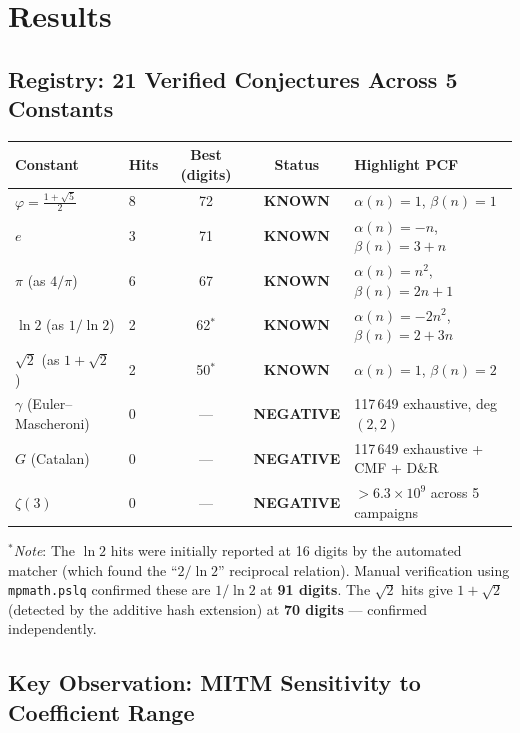 \documentclass[11pt,a4paper]{article}
\newcommand{\KNOWN}{\textcolor{known}{\textbf{KNOWN}}}
\newcommand{\NEG}{\textcolor{negative}{\textbf{NEGATIVE}}}
\begin{document}
\section{Results}

\subsection{Registry: 21 Verified Conjectures Across 5 Constants}

\begin{center}
\renewcommand{\arraystretch}{1.2}
\begin{tabular}{@{}llccl@{}}
\toprule
\textbf{Constant} & \textbf{Hits} & \textbf{Best (digits)} & \textbf{Status} & \textbf{Highlight PCF} \\
\midrule
$\varphi = \tfrac{1+\sqrt{5}}{2}$ & 8 & 72 & \KNOWN &
  $\alpha(n)=1$, $\beta(n)=1$ \\
$e$          & 3 & 71 & \KNOWN &
  $\alpha(n)=-n$, $\beta(n)=3+n$ \\
$\pi$ (as $4/\pi$) & 6 & 67 & \KNOWN &
  $\alpha(n)=n^2$, $\beta(n)=2n+1$ \\
$\ln 2$ (as $1/\ln 2$) & 2 & 62$^*$ & \KNOWN &
  $\alpha(n)=-2n^2$, $\beta(n)=2+3n$ \\
$\sqrt{2}$ (as $1+\sqrt{2}$) & 2 & 50$^*$ & \KNOWN &
  $\alpha(n)=1$, $\beta(n)=2$ \\
\midrule
$\gamma$ (Euler--Mascheroni) & 0 & --- & \NEG &
  117\,649 exhaustive, deg $(2,2)$ \\
$G$ (Catalan)                & 0 & --- & \NEG &
  117\,649 exhaustive + CMF + D\&R \\
$\zeta(3)$                   & 0 & --- & \NEG &
  $>6.3\times10^9$ across 5 campaigns \\
\bottomrule
\end{tabular}
\end{center}

\smallskip\noindent
$^*$\textit{Note}: The $\ln 2$ hits were initially reported at 16 digits
by the automated matcher (which found the ``$2/\ln 2$'' reciprocal relation).
Manual verification using \texttt{mpmath.pslq} confirmed these are
$1/\ln 2$ at \textbf{91 digits}.
The $\sqrt{2}$ hits give $1+\sqrt{2}$ (detected by the additive hash
extension) at \textbf{70 digits} --- confirmed independently.

\subsection{Key Observation: MITM Sensitivity to Coefficient Range}
\end{document}
